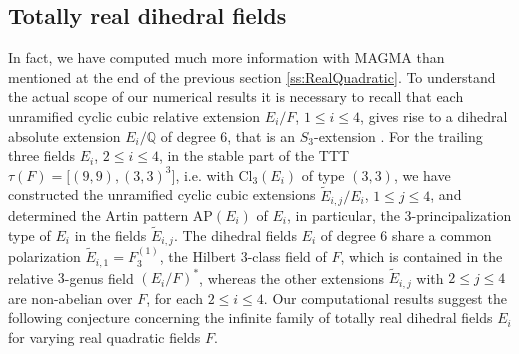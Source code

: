 \documentclass{amsart}
\theoremstyle{definition}
\numberwithin{equation}{section}
\begin{document}
\subsection{Totally real dihedral fields}
\label{ss:TotallyRealDihedral}
\noindent
In fact, we have computed much more information with MAGMA
than mentioned at the end of the previous section
\ref{ss:RealQuadratic}.
To understand the actual scope of our numerical results
it is necessary to recall that each unramified cyclic cubic relative extension \(E_i/F\), \(1\le i\le 4\),
gives rise to a dihedral absolute extension \(E_i/\mathbb{Q}\) of degree \(6\),
that is an \(S_3\)-extension
\cite[Prp. 4.1, p. 482]{Ma1}.
For the trailing three fields \(E_i\), \(2\le i\le 4\),
in the stable part of the TTT \(\tau(F)=\lbrack (9,9),(3,3)^3\rbrack\),
i.e. with \(\mathrm{Cl}_3(E_i)\) of type \((3,3)\),
we have constructed the unramified cyclic cubic extensions \(\tilde{E}_{i,j}/E_i\), \(1\le j\le 4\),
and determined the Artin pattern \(\mathrm{AP}(E_i)\) of \(E_i\),
in particular, the \(3\)-principalization type of \(E_i\) in the fields \(\tilde{E}_{i,j}\).
The dihedral fields \(E_i\) of degree \(6\) share a common polarization
\(\tilde{E}_{i,1}=F_3^{(1)}\), the Hilbert \(3\)-class field of \(F\),
which is contained in the relative \(3\)-genus field \((E_i/F)^\ast\),
whereas the other extensions \(\tilde{E}_{i,j}\) with \(2\le j\le 4\)
are non-abelian over \(F\), for each \(2\le i\le 4\).
Our computational results suggest the following conjecture
concerning the infinite family of totally real dihedral fields
\(E_i\) for varying real quadratic fields \(F\).
\end{document}
